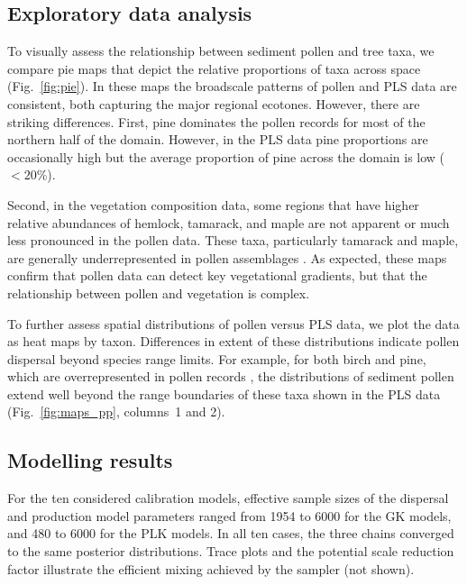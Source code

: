 \documentclass[12pt]{article}
\begin{document}
\subsection{Exploratory data analysis}

To visually assess the relationship between sediment pollen and tree
taxa, we compare pie maps that depict the relative proportions of taxa
across space (Fig.~\ref{fig:pie}). In these maps the broadscale
patterns of pollen and PLS data are consistent, both capturing the
major regional ecotones.  However, there are striking
differences. First, pine dominates the pollen records for most of the
northern half of the domain. However, in the PLS data pine proportions
are occasionally high but the average proportion of pine across the
domain is low ($<20$\%).

Second, in the vegetation composition data, some regions that have
higher relative abundances of hemlock, tamarack, and maple are not
apparent or much less pronounced in the pollen data. These taxa,
particularly tamarack and maple, are generally underrepresented in
pollen assemblages \citep{webb1981estimating,
  bradshaw1985relationships, jackson1990}. As expected, these maps
confirm that pollen data can detect key vegetational gradients, but
that the relationship between pollen and vegetation is complex.

To further assess spatial distributions of pollen versus PLS data, we
plot the data as heat maps by taxon. Differences in extent of these
distributions indicate pollen dispersal beyond species range
limits. For example, for both birch and pine, which are
overrepresented in pollen records \citep{webb1981estimating,
  bradshaw1985relationships, jackson1990, williams2003palynological},
the distributions of sediment pollen extend well beyond the range
boundaries of these taxa shown in the PLS data
(Fig.~\ref{fig:maps_pp}, columns~1 and 2).

\subsection{Modelling results}

For the ten considered calibration models, effective sample sizes of
the dispersal and production model parameters ranged from 1954 to 6000
for the GK models, and 480 to 6000 for the PLK models. In all ten
cases, the three chains converged to the same posterior
distributions. Trace plots and the potential scale reduction factor
illustrate the efficient mixing achieved by the sampler (not shown).
\end{document}
